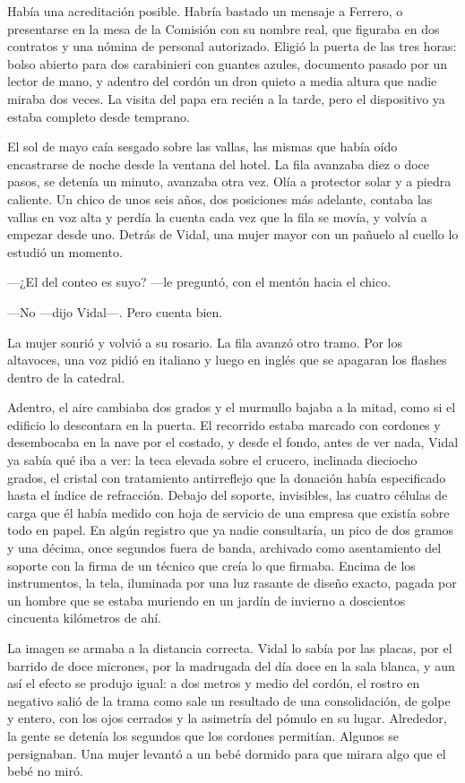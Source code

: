 Había una acreditación posible. Habría bastado un mensaje a Ferrero, o presentarse en la mesa de la Comisión con su nombre real, que figuraba en dos contratos y una nómina de personal autorizado. Eligió la puerta de las tres horas: bolso abierto para dos carabinieri con guantes azules, documento pasado por un lector de mano, y adentro del cordón un dron quieto a media altura que nadie miraba dos veces. La visita del papa era recién a la tarde, pero el dispositivo ya estaba completo desde temprano.

El sol de mayo caía sesgado sobre las vallas, las mismas que había oído encastrarse de noche desde la ventana del hotel. La fila avanzaba diez o doce pasos, se detenía un minuto, avanzaba otra vez. Olía a protector solar y a piedra caliente. Un chico de unos seis años, dos posiciones más adelante, contaba las vallas en voz alta y perdía la cuenta cada vez que la fila se movía, y volvía a empezar desde uno. Detrás de Vidal, una mujer mayor con un pañuelo al cuello lo estudió un momento.

---¿El del conteo es suyo? ---le preguntó, con el mentón hacia el chico.

---No ---dijo Vidal---. Pero cuenta bien.

La mujer sonrió y volvió a su rosario. La fila avanzó otro tramo. Por los altavoces, una voz pidió en italiano y luego en inglés que se apagaran los flashes dentro de la catedral.

Adentro, el aire cambiaba dos grados y el murmullo bajaba a la mitad, como si el edificio lo descontara en la puerta. El recorrido estaba marcado con cordones y desembocaba en la nave por el costado, y desde el fondo, antes de ver nada, Vidal ya sabía qué iba a ver: la teca elevada sobre el crucero, inclinada dieciocho grados, el cristal con tratamiento antirreflejo que la donación había especificado hasta el índice de refracción. Debajo del soporte, invisibles, las cuatro células de carga que él había medido con hoja de servicio de una empresa que existía sobre todo en papel. En algún registro que ya nadie consultaría, un pico de dos gramos y una décima, once segundos fuera de banda, archivado como asentamiento del soporte con la firma de un técnico que creía lo que firmaba. Encima de los instrumentos, la tela, iluminada por una luz rasante de diseño exacto, pagada por un hombre que se estaba muriendo en un jardín de invierno a doscientos cincuenta kilómetros de ahí.

La imagen se armaba a la distancia correcta. Vidal lo sabía por las placas, por el barrido de doce micrones, por la madrugada del día doce en la sala blanca, y aun así el efecto se produjo igual: a dos metros y medio del cordón, el rostro en negativo salió de la trama como sale un resultado de una consolidación, de golpe y entero, con los ojos cerrados y la asimetría del pómulo en su lugar. Alrededor, la gente se detenía los segundos que los cordones permitían. Algunos se persignaban. Una mujer levantó a un bebé dormido para que mirara algo que el bebé no miró.

